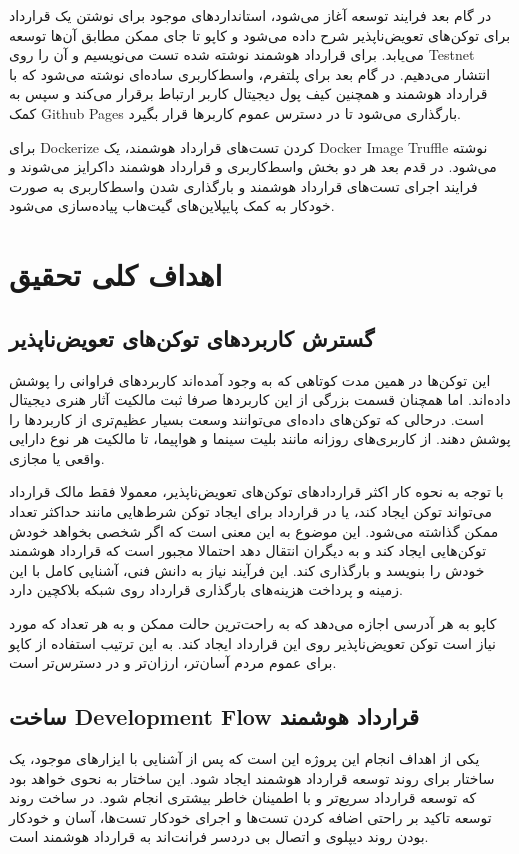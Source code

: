 در گام بعد فرایند توسعه آغاز می‌شود،
استاندارد‌های موجود برای نوشتن یک قرارداد برای توکن‌های تعویض‌ناپذیر شرح داده می‌شود و
کاپو تا جای ممکن مطابق آن‌ها توسعه می‌یابد.
برای قرارداد هوشمند نوشته شده تست می‌نویسیم و آن را روی
\gls{Testnet}
انتشار می‌دهیم.
در گام بعد برای پلتفرم،
واسط‌کاربری ساده‌ای نوشته می‌شود که با قرارداد هوشمند و
همچنین کیف پول دیجیتال کاربر ارتباط برقرار می‌کند و سپس به کمک
\gls{Github Pages}
بارگذاری می‌شود تا در دسترس عموم کاربرها قرار بگیرد.

برای
\gls{Dockerize}
کردن تست‌های قرارداد هوشمند، یک
\gls{Docker Image}
\gls{Truffle}
نوشته می‌شود.
در قدم بعد هر دو بخش واسط‌کاربری و قرارداد هوشمند داکرایز می‌شوند
و فرایند اجرای تست‌های قرارداد هوشمند
و بارگذاری شدن واسط‌کاربری به صورت خودکار به کمک پایپلاین‌های گیت‌هاب پیاده‌سازی می‌شود.


\section{اهداف کلی تحقیق}
\subsection{گسترش کاربرد‌های توکن‌های تعویض‌ناپذیر}
این توکن‌ها در همین مدت کوتاهی که به وجود آمده‌اند کاربردهای فراوانی را پوشش داده‌اند.
اما همچنان قسمت بزرگی از این کاربردها صرفا ثبت مالکیت آثار هنری دیجیتال است.
درحالی که توکن‌های داده‌ای می‌توانند وسعت بسیار عظیم‌تری از کاربردها را پوشش دهند.
از کاربری‌های روزانه مانند بلیت سینما و هواپیما، تا مالکیت هر نوع دارایی واقعی یا مجازی.

با توجه به نحوه کار اکثر قراردادهای توکن‌های تعویض‌ناپذیر،
معمولا فقط مالک قرارداد می‌تواند توکن ایجاد کند،
یا در قرارداد برای ایجاد توکن شرط‌هایی مانند حداکثر تعداد ممکن گذاشته می‌شود.
این موضوع به این معنی است که اگر شخصی بخواهد خودش توکن‌هایی ایجاد کند
و به دیگران انتقال دهد احتمالا مجبور است که قرارداد هوشمند خودش را بنویسد و بارگذاری کند.
این فرآیند نیاز به دانش فنی، آشنایی کامل با این زمینه و پرداخت هزینه‌های بارگذاری قرارداد روی شبکه بلاکچین دارد.

کاپو به هر آدرسی اجازه می‌دهد که به راحت‌ترین حالت ممکن
و به هر تعداد که مورد نیاز است توکن تعویض‌ناپذیر روی این قرارداد ایجاد کند.
به این ترتیب استفاده از کاپو برای عموم مردم آسان‌تر، ارزان‌تر و در دسترس‌تر است.


\subsection{ساخت
\gls{Development Flow}
قرارداد هوشمند}
یکی از اهداف انجام این پروژه این است که پس از آشنایی با ایزارهای موجود،
یک ساختار برای روند توسعه قرارداد هوشمند ایجاد شود.
این ساختار به نحوی خواهد بود که توسعه قرارداد سریع‌تر و با اطمینان خاطر بیشتری انجام شود.
در ساخت روند توسعه تاکید بر راحتی اضافه کردن تست‌ها و اجرای خودکار تست‌ها،
آسان و خودکار بودن روند دیپلوی و اتصال بی دردسر فرانت‌اند به قرارداد هوشمند است.

